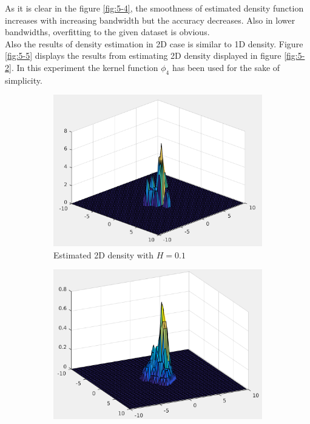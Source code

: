 \documentclass[12pt]{article}
\begin{document}
\begin{itemize}
As it is clear in the figure \ref{fig:5-4}, the smoothness of estimated density function increases with increasing bandwidth but the accuracy decreases. Also in lower bandwidths, overfitting to the given dataset is obvious. \\
Also the results of density estimation in 2D case is similar to 1D density. Figure \ref{fig:5-5} displays the results from estimating 2D density displayed in figure \ref{fig:5-2}. In this experiment the kernel function $\phi_4$ has been used for the sake of simplicity.
\begin{figure}[h]
\centering
\begin{subfigure}{0.45\textwidth}
\centering
\includegraphics[scale=0.35]{Imgs/5-11.png}
\caption{Estimated 2D density with $H = 0.1$}
\end{subfigure}
\begin{subfigure}{0.45\textwidth}
\centering
\includegraphics[scale=0.35]{Imgs/5-9.png}

\end{subfigure}
\end{figure}
\end{itemize}
\end{document}
